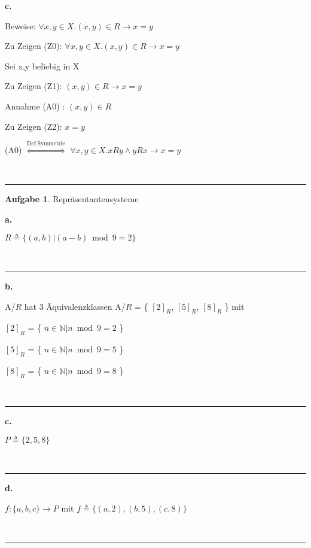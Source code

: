 \documentclass[10pt,leqno ]{article}
\newcommand\customarroweq[1]{\overset{\mathrm{#1}}{\Leftrightarrow}}
\theoremstyle{definition}
\newtheorem{problem}[theorem]{Aufgabe}
\newenvironment{solution}[1][L]{\begin{doublespace}\textbf{#1.}\quad }{\ \rule{0.5em}{0.5em}\end{doublespace}}
\begin{document}
\begin{solution}[c]


    Beweise: \( \forall x,y \in X. (x,y)\in R \rightarrow x=y \)

    Zu Zeigen (Z0):  \( \forall x,y \in X. (x,y)\in R \rightarrow x=y \)

    Sei x,y beliebig in X

    Zu Zeigen (Z1): \( (x,y) \in R \rightarrow x=y \)

    Annahme (A0) : \( (x,y) \in R \)

    Zu Zeigen (Z2): \( x=y \)
    
    (A0) \(\customarroweq{Def. Symmetrie}\) \( \forall x,y \in X. xRy \land yRx \rightarrow x=y \)

\end{solution}



\begin{problem}
    Repräsentantensysteme
\end{problem}

\begin{solution}[a]

    \(R \triangleq \{ (a,b) | (a-b) \bmod 9 = 2 \} \)

\end{solution}

\begin{solution}[b]
    
    A/$R$ hat 3 Äquivalenzklassen
    A/$R$ = \{ $[2]_R$, $[5]_R$, $[8]_R$ \} mit 

    $[2]_R$ = \{ \( n \in \mathbb{N} | n \bmod 9 = 2 \) \}

    $[5]_R$ = \{ \( n \in \mathbb{N} | n \bmod 9 = 5 \) \}

    $[8]_R$ = \{ \( n \in \mathbb{N} | n \bmod 9 = 8 \) \}

\end{solution}

\begin{solution}[c] 

    \( P \triangleq \{ 2,5,8 \} \)
    
\end{solution}

\begin{solution}[d]

    \( f: \{ a,b,c \} \rightarrow P \) mit \(f \triangleq \{ (a,2), (b,5), (c,8) \}\)
    
\end{solution}
\end{document}
